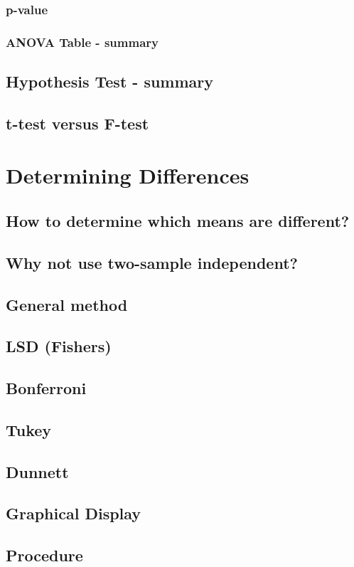         \subsubsection{p-value}  %
        \subsubsection{ANOVA Table - summary}  %
    \subsection{Hypothesis Test - summary}  %
    \subsection{t-test versus F-test}  %

\section{Determining Differences}  %
    \subsection{How to determine which means are different?}  %
    \subsection{Why not use two-sample independent?}  %
    \subsection{General method}  %
    \subsection{LSD (Fishers)}  %
    \subsection{Bonferroni}  %
    \subsection{Tukey}  %
    \subsection{Dunnett}  %
    \subsection{Graphical Display}  %
    \subsection{Procedure}  %
